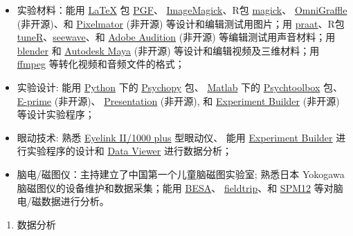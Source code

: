 \documentclass[12pt,]{article}
\providecommand{\tightlist}{%
  \setlength{\itemsep}{0pt}\setlength{\parskip}{0pt}}
\begin{document}
\begin{itemize}
\tightlist
\item
  实验材料：能用 \href{https://www.latex-project.org}{LaTeX} 包
  \href{https://ctan.org/pkg/pgf?lang=en}{PGF}、
  \href{https://imagemagick.org}{ImageMagick}、R包
  \href{https://cran.r-project.org/web/packages/magick/index.html}{magick}、
  \href{https://www.omnigroup.com/omnigraffle/}{OmniGraffle}
  (非开源)、和 \href{https://www.pixelmator.com}{Pixelmator} (非开源)
  等设计和编辑测试用图片；用
  \href{http://www.fon.hum.uva.nl/praat/}{praat}、R包
  \href{https://cran.r-project.org/web/packages/tuneR/index.html}{tuneR}、\href{https://cran.r-project.org/package=seewave}{seewave}、和
  \href{https://www.adobe.com/products/audition.html}{Adobe Audition}
  (非开源) 等编辑测试用声音材料；用
  \href{https://www.blender.org}{blender} 和
  \href{https://www.autodesk.com/products/maya/overview}{Autodesk Maya}
  (非开源) 等设计和编辑视频及三维材料；用
  \href{https://ffmpeg.org}{ffmpeg} 等转化视频和音频文件的格式；
\item
  实验设计: 能用 \href{https://www.python.org}{Python} 下的
  \href{http://www.psychopy.org}{Psychopy} 包、
  \href{https://www.mathworks.com/products/matlab.html}{Matlab} 下的
  \href{http://psychtoolbox.org}{Psychtoolbox} 包、
  \href{https://www.pstnet.com/eprime.cfm}{E-prime} (非开源)、
  \href{https://www.neurobs.com/presentation}{Presentation} (非开源), 和
  \href{https://www.sr-research.com/experiment-builder/}{Experiment
  Builder} (非开源) 等设计实验程序；
\item
  眼动技术: 熟悉 \href{https://www.sr-research.com}{Eyelink II/1000
  plus} 型眼动仪、 能用
  \href{https://www.sr-research.com/experiment-builder/}{Experiment
  Builder} 进行实验程序的设计和
  \href{https://www.sr-research.com/data-viewer/}{Data Viewer}
  进行数据分析；
\item
  脑电/磁图仪：主持建立了中国第一个儿童脑磁图实验室; 熟悉日本 Yokogawa
  脑磁图仪的设备维护和数据采集；能用 \href{http://www.besa.de}{BESA}、
  \href{http://www.fieldtriptoolbox.org}{fieldtrip}、和
  \href{https://github.com/neurodebian/spm12}{SPM12}
  等对脑电/磁数据进行分析。
\end{itemize}

\begin{enumerate}
\def\labelenumi{\arabic{enumi}.}
\setcounter{enumi}{1}
\tightlist
\item
  数据分析
\end{enumerate}
\end{document}
